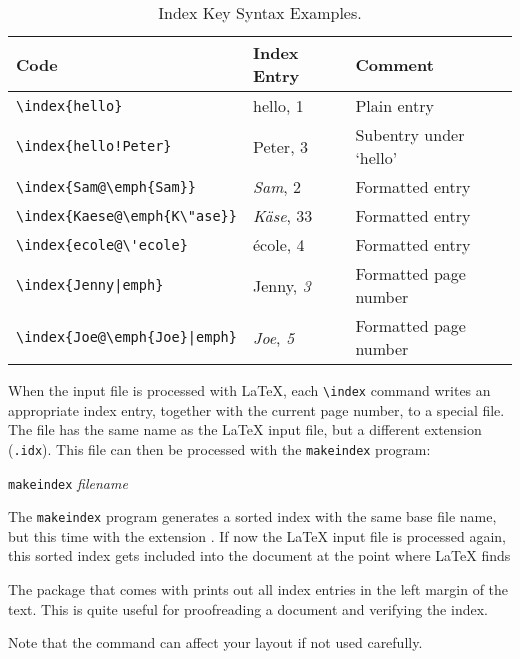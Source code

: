 \begin{table}[!tp]
  \centering
\caption{Index Key Syntax Examples.}\label{index}
\begin{tabular}{@{}lll@{}}
  \toprule
  Code &Index Entry &Comment\\
  \midrule
  \rule{0pt}{1.05em}\verb|\index{hello}| &hello, 1 &Plain entry\\
  \verb|\index{hello!Peter}|   &\hspace*{2ex}Peter, 3 &Subentry under `hello'\\
  \verb|\index{Sam@\emph{Sam}}|     &\emph{Sam}, 2& Formatted entry\\
  \verb|\index{Kaese@\emph{K\"ase}}|     &\emph{K\"ase}, 33& Formatted entry\\
  \verb.\index{ecole@\'ecole}.     &\'ecole, 4& Formatted entry\\
  \verb.\index{Jenny|emph}.     &Jenny, \emph{3}& Formatted page number\\
  \verb.\index{Joe@\emph{Joe}|emph}.     &\emph{Joe}, \emph{5}& Formatted page number\\
\bottomrule
\end{tabular}
\end{table}

When the input file is processed with \LaTeX{}, each \verb|\index|
command writes an appropriate index entry, together with the current
page number, to a special file. The file has the same name as the
\LaTeX{} input file, but a different extension (\verb|.idx|). This
 file can then be processed with the \texttt{makeindex}
program:

\begin{lscommand}
  \texttt{makeindex} \emph{filename}
\end{lscommand}
The \texttt{makeindex} program generates a sorted index with the same base
file name, but this time with the extension . If now the
\LaTeX{} input file is processed again, this sorted index gets
included into the document at the point where \LaTeX{} finds
\begin{lscommand}
\end{lscommand}

The  package that comes with \LaTeXe{} prints out all
index entries in the left margin of the text. This is quite useful for
proofreading a document and verifying the index.

Note that the  command can affect your layout if not used carefully.

